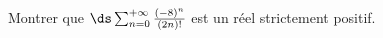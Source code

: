 \begin{enonce}
\begin{exercise}[ID={RMS124 E1267},subtitle={},tags={}]
Montrer que 
$\ds\sum_{n=0}^{+\infty} \frac{\left( -8 \right)^n}{\left( 2n \right)!}$
est un réel strictement positif.
\end{exercise}
\begin{solution}
\end{solution}
\end{enonce}
